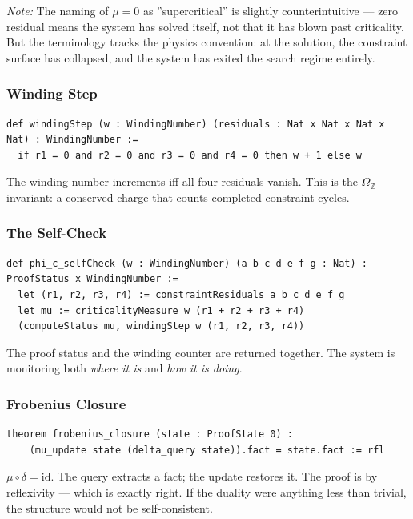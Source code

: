 \documentclass[12pt,a4paper]{article}
\begin{document}
\emph{Note:} The naming of $\mu = 0$ as ''supercritical'' is slightly counterintuitive --- zero residual means the system has solved itself, not that it has blown past criticality. But the terminology tracks the physics convention: at the solution, the constraint surface has collapsed, and the system has exited the search regime entirely.

\subsubsection{Winding Step}

\begin{lstlisting}[language=lean]
def windingStep (w : WindingNumber) (residuals : Nat x Nat x Nat x Nat) : WindingNumber :=
  if r1 = 0 and r2 = 0 and r3 = 0 and r4 = 0 then w + 1 else w
\end{lstlisting}

The winding number increments iff all four residuals vanish. This is the $\Omega_\mathbb{Z}$ invariant: a conserved charge that counts completed constraint cycles.

\subsubsection{The Self-Check}

\begin{lstlisting}[language=lean]
def phi_c_selfCheck (w : WindingNumber) (a b c d e f g : Nat) : ProofStatus x WindingNumber :=
  let (r1, r2, r3, r4) := constraintResiduals a b c d e f g
  let mu := criticalityMeasure w (r1 + r2 + r3 + r4)
  (computeStatus mu, windingStep w (r1, r2, r3, r4))
\end{lstlisting}

The proof status and the winding counter are returned together. The system is monitoring both \emph{where it is} and \emph{how it is doing}.

\subsubsection{Frobenius Closure}

\begin{lstlisting}[language=lean]
theorem frobenius_closure (state : ProofState 0) :
    (mu_update state (delta_query state)).fact = state.fact := rfl
\end{lstlisting}

$\mu \circ \delta = \text{id}$. The query extracts a fact; the update restores it. The proof is by reflexivity --- which is exactly right. If the duality were anything less than trivial, the structure would not be self-consistent.
\end{document}
